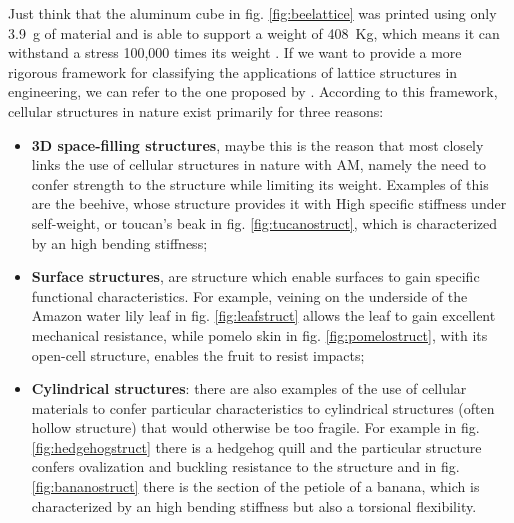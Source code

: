 Just think that the aluminum cube in fig. \ref{fig:beelattice} was printed using only \SI{3.9}{g} of material and is able to support a weight of \SI{408}{Kg}, which means it can withstand a stress 100,000 times its weight \cite{noauthor_3d_2014}. If we want to provide a more rigorous framework for classifying the applications of lattice structures in engineering, we can refer to the one proposed by \citeauthor{mcnulty_framework_2017}. According to this framework, cellular structures in nature exist primarily for three reasons:
\begin{itemize}
    \item \textbf{3D space-filling structures}, maybe this is the reason that most closely links the use of cellular structures in nature with AM, namely the need to confer strength to the structure while limiting its weight. Examples of this are the beehive, whose structure provides it with High specific stiffness under self-weight, or toucan's beak in fig. \ref{fig:tucanostruct}, which is characterized by an high bending stiffness;
    \item \textbf{Surface structures}, are structure which enable surfaces to gain specific functional characteristics. For example, veining on the underside of the Amazon water lily leaf in fig. \ref{fig:leafstruct} allows the leaf to gain excellent mechanical resistance, while pomelo skin in fig. \ref{fig:pomelostruct}, with its open-cell structure, enables the fruit to resist impacts;
    \item \textbf{Cylindrical structures}: there are also examples of the use of cellular materials to confer particular characteristics to cylindrical structures (often hollow structure) that would otherwise be too fragile. For example in fig. \ref{fig:hedgehogstruct} there is a hedgehog quill and the particular structure confers ovalization and buckling resistance to the structure and in fig. \ref{fig:bananostruct} there is the section of the petiole of a banana, which is characterized by an high bending stiffness but also a torsional flexibility.
\end{itemize}
